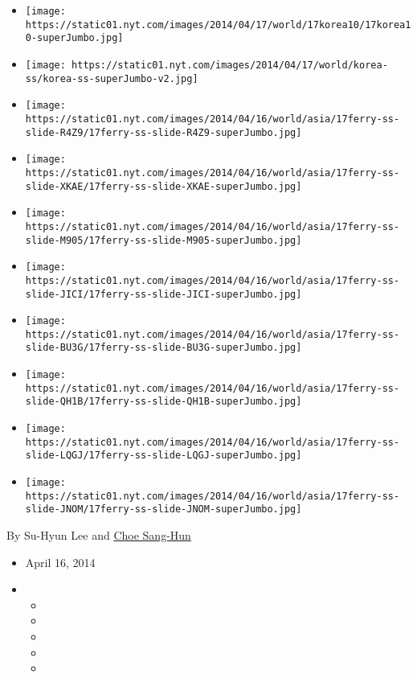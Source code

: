\begin{itemize}
\item
  \texttt{[image: https://static01.nyt.com/images/2014/04/17/world/17korea10/17korea10-superJumbo.jpg]}
\item
  \texttt{[image: https://static01.nyt.com/images/2014/04/17/world/korea-ss/korea-ss-superJumbo-v2.jpg]}
\item
  \texttt{[image: https://static01.nyt.com/images/2014/04/16/world/asia/17ferry-ss-slide-R4Z9/17ferry-ss-slide-R4Z9-superJumbo.jpg]}
\item
  \texttt{[image: https://static01.nyt.com/images/2014/04/16/world/asia/17ferry-ss-slide-XKAE/17ferry-ss-slide-XKAE-superJumbo.jpg]}
\item
  \texttt{[image: https://static01.nyt.com/images/2014/04/16/world/asia/17ferry-ss-slide-M905/17ferry-ss-slide-M905-superJumbo.jpg]}
\item
  \texttt{[image: https://static01.nyt.com/images/2014/04/16/world/asia/17ferry-ss-slide-JICI/17ferry-ss-slide-JICI-superJumbo.jpg]}
\item
  \texttt{[image: https://static01.nyt.com/images/2014/04/16/world/asia/17ferry-ss-slide-BU3G/17ferry-ss-slide-BU3G-superJumbo.jpg]}
\item
  \texttt{[image: https://static01.nyt.com/images/2014/04/16/world/asia/17ferry-ss-slide-QH1B/17ferry-ss-slide-QH1B-superJumbo.jpg]}
\item
  \texttt{[image: https://static01.nyt.com/images/2014/04/16/world/asia/17ferry-ss-slide-LQGJ/17ferry-ss-slide-LQGJ-superJumbo.jpg]}
\item
  \texttt{[image: https://static01.nyt.com/images/2014/04/16/world/asia/17ferry-ss-slide-JNOM/17ferry-ss-slide-JNOM-superJumbo.jpg]}
\end{itemize}

By Su-Hyun Lee and \href{http://www.nytimes.com/by/choe-sang-hun}{Choe
Sang-Hun}

\begin{itemize}
\item
  April 16, 2014
\item
  \begin{itemize}
  \item
  \item
  \item
  \item
  \item
  \end{itemize}
\end{itemize}

